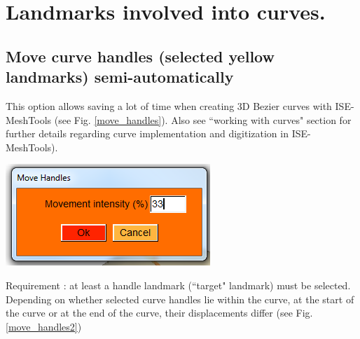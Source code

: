 \section{Landmarks involved into curves.}

\subsection{Move curve handles (selected yellow
landmarks) semi-automatically}
\noindent
\begin{minipage}{0.5\textwidth}
This option allows saving a lot of time when creating
3D Bezier curves with ISE-MeshTools (see Fig. \ref{move_handles}). Also see ``working
with curves" section for further details regarding curve
implementation and digitization in ISE-MeshTools).
\end{minipage}    
\begin{minipage}{0.5\textwidth}\centering
  \includegraphics[scale=0.5]{images/Edit_selected_landmarks/Move.png}
 \end{minipage} 
\noindent



Requirement : at least a handle landmark (``target" landmark) must be selected.
Depending on whether selected curve handles lie within the curve, at the start of the curve or at the
end of the curve, their displacements differ (see Fig. \ref{move_handles2})




